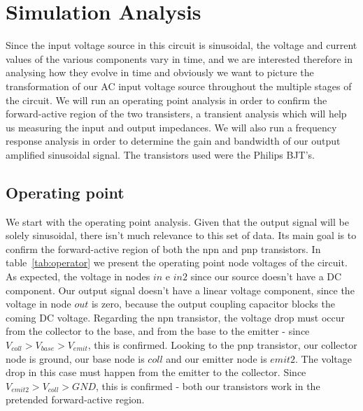 \newpage
\section{Simulation Analysis}
\label{sec:simulation}
Since the input voltage source in this circuit is sinusoidal, the voltage and current values of the various components vary in time, and we are interested therefore in analysing how they evolve in time and obviously we want to picture the transformation of our AC input voltage source throughout the multiple stages of the circuit. We will run an operating point analysis in order to confirm the forward-active region of the two transisters, a transient analysis which will help us measuring the input and output impedances. We will also run a frequency response analysis in order to determine the gain and bandwidth of our output amplified sinusoidal signal. The transistors used were the Philips BJT's.

\subsection{Operating point}
We start with the operating point analysis. Given that the output signal will be solely sinusoidal, there isn't much relevance to this set of data. Its main goal is to confirm the forward-active region of both the npn and pnp transistors. In table~\ref{tab:operator} we present the operating point node voltages of the circuit. As expected, the voltage in nodes $in$ e $in2$ since our source doesn't have a DC component. Our output signal doesn't have a linear voltage component, since the voltage in node $out$ is zero, because the output coupling capacitor blocks the coming DC voltage. Regarding the npn transistor, the voltage drop must occur from the collector to the base, and from the base to the emitter - since $V_{coll}>V_{base}>V_{emit}$, this is confirmed. Looking to the pnp transistor, our collector node is ground, our base node is $coll$ and our emitter node is $emit2$. The voltage drop in this case must happen from the emitter to the collector. Since $V_{emit2}>V_{coll}>GND$, this is confirmed - both our transistors work in the pretended forward-active region.



